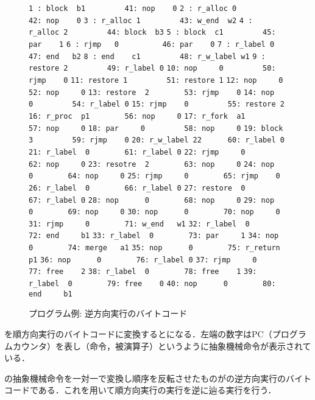 \documentclass[submit,PRO]{ipsj}
\def\|{\verb|}
\begin{document}
\begin{figure}[tb]
\vbox{
\hbox{\|1 : block  b1         41: nop    0|}
\hbox{\|2 : r_alloc 0         42: nop    0|}
\hbox{\|3 : r_alloc 1         43: w_end  w2|}
\hbox{\|4 : r_alloc 2         44: block  b3|}
\hbox{\|5 : block  c1         45: par    1|}
\hbox{\|6 : rjmp   0          46: par    0|}
\hbox{\|7 : r_label 0          47: end   b2|}
\hbox{\|8 : end    c1         48: r_w_label w1|}
\hbox{\|9 : restore 2         49: r_label 0|}
\hbox{\|10: nop     0         50: rjmp    0|}
\hbox{\|11: restore 1         51: restore 1|}
\hbox{\|12: nop     0         52: nop     0|}
\hbox{\|13: restore  2        53: rjmp    0|}
\hbox{\|14: nop     0         54: r_label 0|}
\hbox{\|15: rjmp    0         55: restore 2|}
\hbox{\|16: r_proc  p1        56: nop     0|}
\hbox{\|17: r_fork  a1        57: nop     0|}
\hbox{\|18: par     0         58: nop     0|}
\hbox{\|19: block   3         59: rjmp    0|}
\hbox{\|20: r_w_label 22      60: r_label 0|}
\hbox{\|21: r_label  0        61: r_label 0|}
\hbox{\|22: rjmp     0        62: nop     0|}
\hbox{\|23: resotre  2        63: nop     0|}
\hbox{\|24: nop      0        64: nop     0|}
\hbox{\|25: rjmp     0        65: rjmp    0|}
\hbox{\|26: r_label  0        66: r_label 0|}
\hbox{\|27: restore  0        67: r_label 0|}
\hbox{\|28: nop      0        68: nop     0|}
\hbox{\|29: nop      0        69: nop     0|}
\hbox{\|30: nop      0        70: nop     0|}
\hbox{\|31: rjmp     0        71: w_end   w1|}
\hbox{\|32: r_label  0        72: end     b1|}
\hbox{\|33: r_label  0        73: par     1|}
\hbox{\|34: nop      0        74: merge   a1|} 
\hbox{\|35: nop      0        75: r_return p1|}
\hbox{\|36: nop      0        76: r_label 0|}
\hbox{\|37: rjmp     0        77: free    2|}
\hbox{\|38: r_label  0        78: free    1|}
\hbox{\|39: r_label  0        79: free    0|}
\hbox{\|40: nop      0        80: end     b1|}
}
\centerline{}
\caption{プログラム例: 逆方向実行のバイトコード}
\label{fig:backward}
\end{figure}



を順方向実行のバイトコードに変換するとになる．左端の数字はPC（プログラムカウンタ）を表し（命令，被演算子）というように抽象機械命令が表示されている．

の抽象機械命令を一対一で変換し順序を反転させたものがの逆方向実行のバイトコードである．これを用いて順方向実行の実行を逆に辿る実行を行う．
\end{document}
